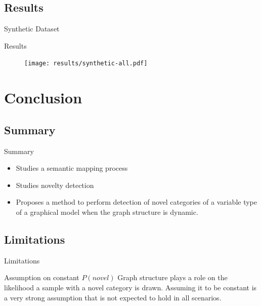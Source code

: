 \documentclass[compress]{beamer}
\begin{document}
\subsection{Results}
\begin{frame}{Synthetic Dataset}

\end{frame}

\begin{frame}{Results}
  \begin{figure}
    \texttt{[image: results/synthetic-all.pdf]}
  \end{figure}
\end{frame}

\section{Conclusion}

\subsection{Summary}
\begin{frame}{Summary}
\begin{itemize}
\item Studies a semantic mapping process
\item Studies novelty detection
\item Proposes a method to perform detection of novel categories
      of a variable type of a graphical model when the graph structure
      is dynamic.
\end{itemize}
\end{frame}

\subsection{Limitations}
\begin{frame}{Limitations}
\begin{block}{Assumption on constant $P(novel)$}
Graph structure plays a role on the likelihood a sample with a novel
category is drawn. Assuming it to be constant is a very strong assumption
that is not expected to hold in all scenarios.
\end{block}
\end{frame}
\end{document}
